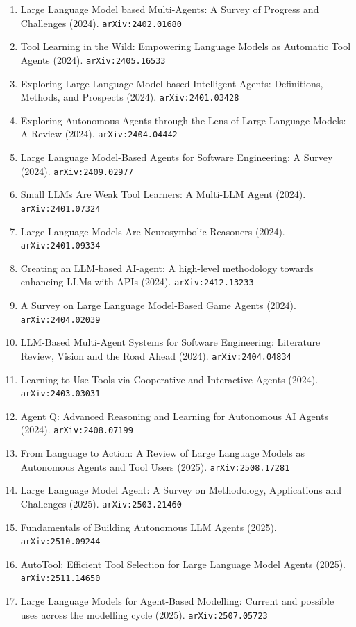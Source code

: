\documentclass[11pt]{article}
\begin{document}
\begin{enumerate}
  \item Large Language Model based Multi-Agents: A Survey of Progress and
  Challenges (2024). \texttt{arXiv:2402.01680}
  \item Tool Learning in the Wild: Empowering Language Models as Automatic Tool
  Agents (2024). \texttt{arXiv:2405.16533}
  \item Exploring Large Language Model based Intelligent Agents: Definitions,
  Methods, and Prospects (2024). \texttt{arXiv:2401.03428}
  \item Exploring Autonomous Agents through the Lens of Large Language Models: A
  Review (2024). \texttt{arXiv:2404.04442}
  \item Large Language Model-Based Agents for Software Engineering: A Survey (2024). \texttt{arXiv:2409.02977}
  \item Small LLMs Are Weak Tool Learners: A Multi-LLM Agent (2024). \texttt{arXiv:2401.07324}
  \item Large Language Models Are Neurosymbolic Reasoners (2024). \texttt{arXiv:2401.09334}
  \item Creating an LLM-based AI-agent: A high-level methodology towards
  enhancing LLMs with APIs (2024). \texttt{arXiv:2412.13233}
  \item A Survey on Large Language Model-Based Game Agents (2024). \texttt{arXiv:2404.02039}
  \item LLM-Based Multi-Agent Systems for Software Engineering: Literature Review, Vision and the Road Ahead (2024). \texttt{arXiv:2404.04834}
  \item Learning to Use Tools via Cooperative and Interactive Agents (2024). \texttt{arXiv:2403.03031}
  \item Agent Q: Advanced Reasoning and Learning for Autonomous AI Agents (2024). \texttt{arXiv:2408.07199}
  \item From Language to Action: A Review of Large Language Models as Autonomous Agents and Tool Users (2025). \texttt{arXiv:2508.17281}
  \item Large Language Model Agent: A Survey on Methodology, Applications and
  Challenges (2025). \texttt{arXiv:2503.21460}
  \item Fundamentals of Building Autonomous LLM Agents (2025). \texttt{arXiv:2510.09244}
  \item AutoTool: Efficient Tool Selection for Large Language Model Agents (2025). \texttt{arXiv:2511.14650}
  \item Large Language Models for Agent-Based Modelling: Current and possible uses across the modelling cycle (2025). \texttt{arXiv:2507.05723}

\end{enumerate}
\end{document}
